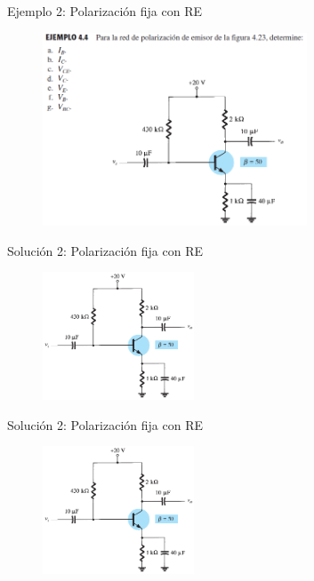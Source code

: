 \documentclass[t,aspectratio=169]{beamer}
\begin{document}
\begin{frame}{Ejemplo 2: Polarización fija con RE}

\begin{figure}
    \centering
    \includegraphics[width=0.7\textwidth]{figures/polarizacion_fija_RE_ejemplo.png}
\end{figure}
    
\end{frame}



\begin{frame}{Solución 2: Polarización fija con RE}

\begin{figure}
    \flushleft
    \includegraphics[width=0.4\textwidth]{figures/polarizacion_fija_RE_solucion.png}
\end{figure}

\end{frame}



\begin{frame}{Solución 2: Polarización fija con RE}

\begin{figure}
    \flushleft
    \includegraphics[width=0.4\textwidth]{figures/polarizacion_fija_RE_solucion.png}
\end{figure}
    
\end{frame}
\end{document}
